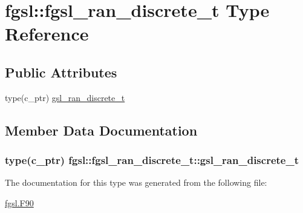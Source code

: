 \hypertarget{structfgsl_1_1fgsl__ran__discrete__t}{}\section{fgsl\+:\+:fgsl\+\_\+ran\+\_\+discrete\+\_\+t Type Reference}
\label{structfgsl_1_1fgsl__ran__discrete__t}
\subsection*{Public Attributes}
\begin{DoxyCompactItemize}
\item 
type(c\+\_\+ptr) \hyperlink{structfgsl_1_1fgsl__ran__discrete__t_ae63ca57e21d5ecf4d68f34a65a43141f}{gsl\+\_\+ran\+\_\+discrete\+\_\+t}
\end{DoxyCompactItemize}


\subsection{Member Data Documentation}
\hypertarget{structfgsl_1_1fgsl__ran__discrete__t_ae63ca57e21d5ecf4d68f34a65a43141f}{}
\subsubsection[{gsl\+\_\+ran\+\_\+discrete\+\_\+t}]{\setlength{\rightskip}{0pt plus 5cm}type(c\+\_\+ptr) fgsl\+::fgsl\+\_\+ran\+\_\+discrete\+\_\+t\+::gsl\+\_\+ran\+\_\+discrete\+\_\+t}\label{structfgsl_1_1fgsl__ran__discrete__t_ae63ca57e21d5ecf4d68f34a65a43141f}


The documentation for this type was generated from the following file\+:\begin{DoxyCompactItemize}
\item 
\hyperlink{fgsl_8F90}{fgsl.\+F90}\end{DoxyCompactItemize}
